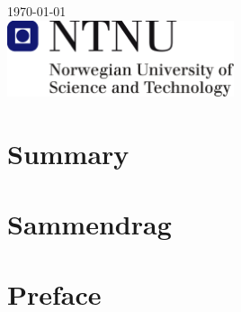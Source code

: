 \documentclass[12pt, a4paper, twoside, openright]{report}
\numberwithin{equation}{chapter}
\numberwithin{figure}{chapter}
\numberwithin{table}{chapter}
\begin{document}
\begin{titlepage}


{\large \today}\\[3cm] %


\includegraphics[width=0.5\textwidth]{Figures/ntnu-logo.png} %
 

\vfill %

\end{titlepage}



\chapter*{Summary}
\newpage

\chapter*{Sammendrag}
\newpage

\chapter*{Preface}
\end{document}
